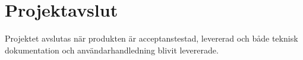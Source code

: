 \section{Projektavslut}

Projektet avslutas när produkten är acceptanstestad, levererad och både teknisk dokumentation och användarhandledning blivit levererade. 